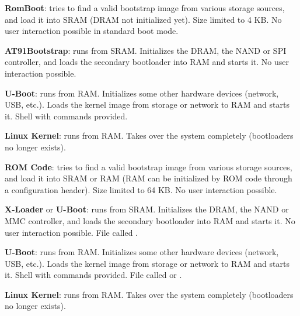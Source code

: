      \startitemize
    \item {\bf RomBoot}: tries to find a valid bootstrap image from
      various storage sources, and load it into SRAM (DRAM not
      initialized yet). Size limited to 4 KB. No user interaction
      possible in standard boot mode.
    \item {\bf AT91Bootstrap}: runs from SRAM. Initializes the DRAM,
      the NAND or SPI controller, and loads the secondary bootloader
      into RAM and starts it. No user interaction possible.
    \item {\bf U-Boot}: runs from RAM. Initializes some other hardware
      devices (network, USB, etc.).  Loads the kernel image from
      storage or network to RAM and starts it. Shell with commands
      provided.
    \item {\bf Linux Kernel}: runs from RAM. Takes over the system
      completely (bootloaders no longer exists).
    \stopitemize

    \startitemize
    \item {\bf ROM Code}: \tfx tries to find a valid bootstrap image from
      various storage sources, and load it into SRAM or RAM (RAM can
      be initialized by ROM code through a configuration header). Size
      limited to 64 KB. No user interaction possible.
    \item {\bf X-Loader} or {\bf U-Boot}: \tfx runs from SRAM. Initializes
      the DRAM, the NAND or MMC controller, and loads the secondary
      bootloader into RAM and starts it. No user interaction
      possible. File called .
    \item {\bf U-Boot}: \tfx runs from RAM. Initializes some other hardware
      devices (network, USB, etc.).  Loads the kernel image from
      storage or network to RAM and starts it. Shell with commands
      provided. File called  or .
    \item {\bf Linux Kernel}: \tfx runs from RAM. Takes over the system
      completely (bootloaders no longer exists).
    \stopitemize


